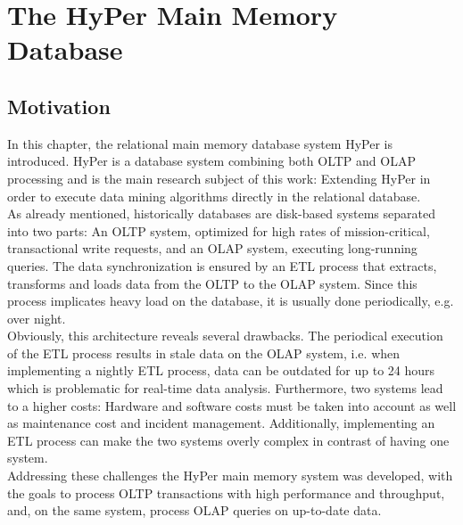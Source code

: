 \chapter{The HyPer Main Memory Database}\label{chapter:hyper}
\section{Motivation}
In this chapter, the relational main memory database system HyPer is introduced. HyPer is a database system combining both OLTP and OLAP processing and is the main research subject of this work: Extending HyPer in order to execute data mining algorithms directly in the relational database.
\\
As already mentioned, historically databases are disk-based systems separated into two parts: An OLTP system, optimized for high rates of mission-critical, transactional write requests, and an OLAP system, executing long-running queries. The data synchronization is ensured by an ETL process that extracts, transforms and loads data from the OLTP to the OLAP system. Since this process implicates heavy load on the database, it is usually done periodically, e.g. over night. 
\\
Obviously, this architecture reveals several drawbacks. The periodical execution of the ETL process results in stale data on the OLAP system, i.e. when implementing a nightly ETL process, data can be outdated for up to 24 hours which is problematic for real-time data analysis. Furthermore, two systems lead to a higher costs: Hardware and software costs must be taken into account as well as maintenance cost and incident management. Additionally, implementing an ETL process can make the two systems overly complex in contrast of having one system.
\\
Addressing these challenges the HyPer main memory system was developed, with the goals to process OLTP transactions with high performance and throughput, and, on the same system, process OLAP queries on up-to-date data. 

